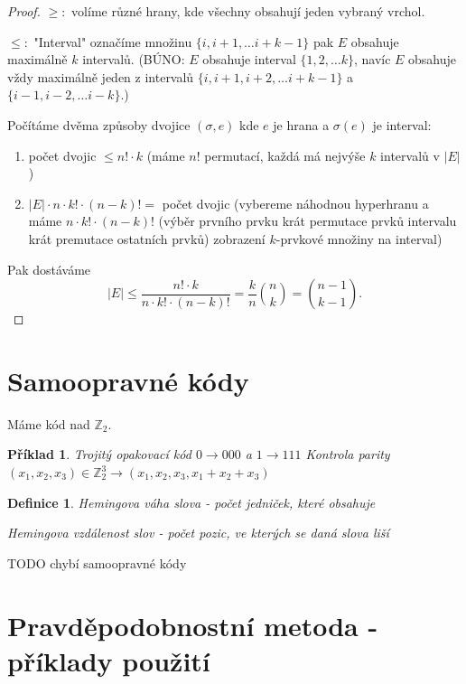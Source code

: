 \documentclass[a4paper,10pt,titlepage]{article} \usepackage[utf8]{inputenc}
\newtheorem{define}{Definice}
\newtheorem*{example}{Příklad}
\begin{document}
\begin{proof}
$\geq :$ volíme různé hrany, kde všechny obsahují jeden vybraný vrchol.

$\leq :$ "Interval" označíme množinu $\{i,i+1,\ldots i+k-1\}$ pak $E$ obsahuje maximálně $k$ intervalů.
(BÚNO: $E$ obsahuje interval $\{1,2,\ldots k\}$, navíc $E$ obsahuje vždy maximálně jeden z intervalů 
$\{i,i+1,i+2,\ldots i+k-1\}$ a $\{i-1,i-2,\ldots i-k\}$.)

Počítáme dvěma způsoby dvojice $(\sigma,e)$ kde $e$ je hrana a $\sigma(e)$ je interval:
\begin{enumerate}
\item počet dvojic $\leq n! \cdot k$ (máme $n!$ permutací, každá má nejvýše $k$ intervalů v $|E|$)
\item $|E| \cdot n \cdot k! \cdot (n-k)! = $ počet dvojic
	(vybereme náhodnou hyperhranu a máme $n \cdot k! \cdot (n-k)!$ (výběr prvního prvku krát permutace prvků intervalu krát
	premutace ostatních prvků) zobrazení $k$-prvkové množiny na interval)
\end{enumerate}
Pak dostáváme 
\[
	|E| \leq \frac{n! \cdot k}{ n \cdot k! \cdot (n-k)!} = \frac{k}{n}\binom{n}{k} = \binom{n-1}{k-1}.
\]
\end{proof}

\medskip

\section{Samoopravné kódy}

Máme kód nad $\mathbb{Z}_2$.

\begin{example}
Trojitý opakovací kód $0 \rightarrow 000$ a $1 \rightarrow 111$
Kontrola parity $(x_1,x_2,x_3) \in \mathbb{Z}_2^3 \rightarrow (x_1,x_2,x_3,x_1+x_2+x_3)$
\end{example}

\begin{define}
Hemingova váha slova - počet jedniček, které obsahuje

Hemingova vzdálenost slov - počet pozic, ve kterých se daná slova liší
\end{define}

TODO chybí samoopravné kódy
\medskip

\section{Pravděpodobnostní metoda - příklady použití}
\end{document}
